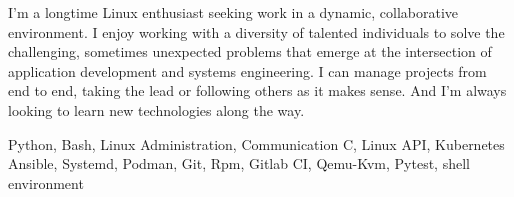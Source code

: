 
\begin{cvparagraph}
  I'm a longtime Linux enthusiast seeking work in a dynamic, collaborative environment.
  I enjoy working with a diversity of talented individuals to solve the challenging, sometimes unexpected problems that emerge at the intersection of application development and systems engineering.
  I can manage projects from end to end, taking the lead or following others as it makes sense.
  And I'm always looking to learn new technologies along the way.
\end{cvparagraph}

\begin{cvbox}
\begin{cvskills}
   {Python, Bash, Linux Administration, Communication}
   {C, Linux API, Kubernetes}
   {Ansible, Systemd, Podman, Git, Rpm, Gitlab CI, Qemu-Kvm, Pytest, shell environment}
\end{cvskills}
\end{cvbox}
